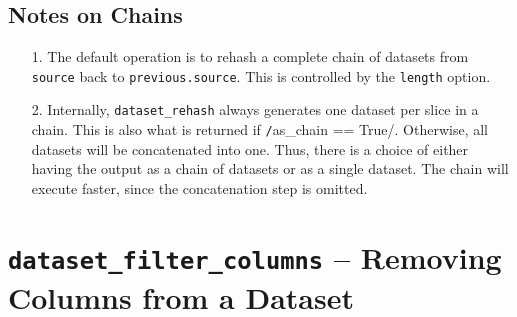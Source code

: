 \subsection{Notes on Chains}

\begin{enumerate}
  \item[1.]  The default operation is to rehash a complete chain of
    datasets from \texttt{source} back to \texttt{previous.source}.
    This is controlled by the \texttt{length} option.

  \item[2.]  Internally, \texttt{dataset\_rehash} always generates one
    dataset per slice in a chain.  This is also what is returned if
    \texttt/as\_chain == True/.  Otherwise, all datasets
    will be concatenated into one.  Thus, there is a choice of either
    having the output as a chain of datasets or as a single dataset.
    The chain will execute faster, since the concatenation step is
    omitted.
\end{enumerate}







\clearpage
\section{\texttt{dataset\_filter\_columns} -- Removing Columns from a Dataset}

